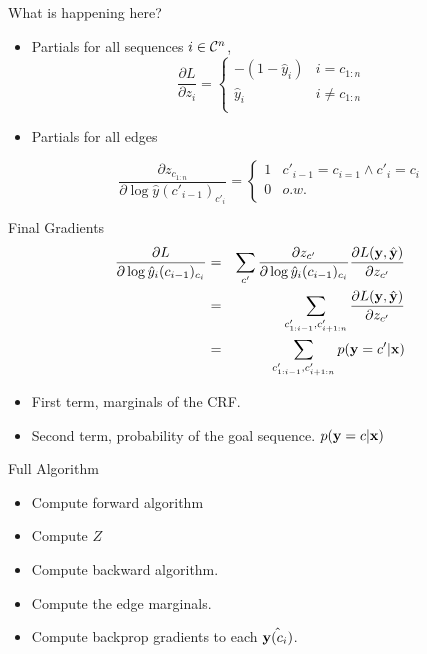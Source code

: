 \documentclass{beamer}
\begin{document}
 \begin{frame}{What is happening here?}
   \begin{itemize}
   \item Partials for all sequences $i \in \mathcal{C}^n$,
   \[ \frac{\partial L }{\partial z_{i}} =
     \begin{cases}
       -(1 - \hat{y}_i) & i = c_{1:n}\\
       \hat{y}_i  & i \neq c_{1:n} \\
     \end{cases} \]

   \item 
     Partials for all edges

     \[ \frac{\partial z_{c_{1:n}} }{\partial\log \hat{y}(c'_{i-1})_{c'_{i}}} =
         \begin{cases}
           1 & c'_{i-1} = c_{i=1} \land c'_{i} = c_{i}\\
           0  & o.w. \\
         \end{cases} \]
     \end{itemize}
 \end{frame}
     
 \begin{frame}{Final Gradients}
   \begin{eqnarray*}
    \frac{\partial L}{\partial \log \hat{y}_i(c_{i-1})_{c_{i}}} &=&
    \sum_{c'} \frac{\partial z_{c'} }{\partial \log \hat{y}_i(c_{i-1})_{c_{i}}} \frac{\partial L(\mathbf{y}, \hat{\mathbf{y}}) } {\partial z_{c'}}  \\
     &=& \sum_{c'_{1:i-1}, c'_{i+1:n}}  \frac{\partial L(\mathbf{y}, \hat{\mathbf{y}}) }{\partial z_{c'}}  \\
    &=& \sum_{c'_{1:i-1}, c'_{i+1:n}}  p(\mathbf{y} = c'  | \mathbf{x})
   \end{eqnarray*}

   \begin{itemize}
   \item First term, marginals of the CRF. 

     \air 

   \item Second term, probability of the goal sequence. $p(\mathbf{y} = c  | \mathbf{x})$ 
   \end{itemize}
 \end{frame}


 \begin{frame}{Full Algorithm}
   \begin{itemize}
   \item Compute forward algorithm
   \item Compute $Z$
   \item Compute backward algorithm. 
   \item Compute the edge marginals. 
   \item Compute backprop gradients to each $\hat{\bold{y}(c_i)}$. 
   \end{itemize}

 \end{frame}
\end{document}
